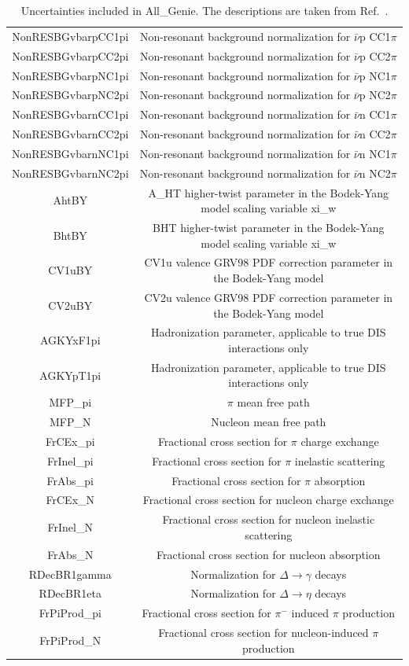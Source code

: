 \begin{table}[H]
\begin{tabular}{| c | c |}
NonRESBGvbarpCC1pi & Non-resonant background normalization for $\bar\nu$p CC1$\pi$\\
NonRESBGvbarpCC2pi & Non-resonant background normalization for $\bar\nu$p CC2$\pi$\\
NonRESBGvbarpNC1pi & Non-resonant background normalization for $\bar\nu$p NC1$\pi$\\
NonRESBGvbarpNC2pi & Non-resonant background normalization for $\bar\nu$p NC2$\pi$\\
NonRESBGvbarnCC1pi & Non-resonant background normalization for $\bar\nu$n CC1$\pi$\\
NonRESBGvbarnCC2pi & Non-resonant background normalization for $\bar\nu$n CC2$\pi$\\
NonRESBGvbarnNC1pi & Non-resonant background normalization for $\bar\nu$n NC1$\pi$\\
NonRESBGvbarnNC2pi & Non-resonant background normalization for $\bar\nu$n NC2$\pi$\\
AhtBY & A\_HT higher-twist parameter in the Bodek-Yang model scaling variable xi\_w\\
BhtBY & BHT higher-twist parameter in the Bodek-Yang model scaling variable xi\_w\\
CV1uBY & CV1u valence GRV98 PDF correction parameter in the Bodek-Yang model\\
CV2uBY & CV2u valence GRV98 PDF correction parameter in the Bodek-Yang model\\
AGKYxF1pi & Hadronization parameter, applicable to true DIS interactions only\\
AGKYpT1pi & Hadronization parameter, applicable to true DIS interactions only\\
MFP\_pi & $\pi$ mean free path\\
MFP\_N & Nucleon mean free path\\
FrCEx\_pi & Fractional cross section for $\pi$ charge exchange\\
FrInel\_pi & Fractional cross section for $\pi$ inelastic scattering\\
FrAbs\_pi & Fractional cross section for $\pi$ absorption\\
FrCEx\_N & Fractional cross section for nucleon charge exchange\\
FrInel\_N & Fractional cross section for nucleon inelastic scattering\\
FrAbs\_N & Fractional cross section for nucleon absorption\\
RDecBR1gamma & Normalization for $\Delta\to\gamma$ decays\\
RDecBR1eta & Normalization for $\Delta\to\eta$ decays\\
FrPiProd\_pi & Fractional cross section for $\pi^-$ induced $\pi$ production\\
FrPiProd\_N & Fractional cross section for nucleon-induced $\pi$ production\\
\hline
\end{tabular}
\caption{Uncertainties included in All\_Genie. The descriptions are taken from Ref.~\cite{bib:geniesupportnote}.}
\label{tab:AllGenie}
\end{table}


